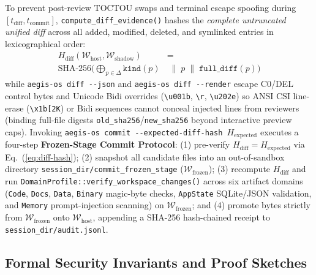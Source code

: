 \documentclass[10pt,twocolumn]{article}
\begin{document}
To prevent post-review TOCTOU swaps and terminal escape spoofing during $[t_{\text{diff}}, t_{\text{commit}}]$, \texttt{compute\_diff\_evidence()} hashes the \emph{complete untruncated unified diff} across all added, modified, deleted, and symlinked entries in lexicographical order:
\begin{equation}
\label{eq:diff-hash}
\begin{aligned}
H_{\text{diff}}(\mathcal{W}_{\text{host}}, \mathcal{W}_{\text{shadow}}) &= \\
\text{SHA-256}\Big(\bigoplus_{p \in \Delta} \texttt{kind}(p) &\;\|\; p \;\|\; \texttt{full\_diff}(p) \Big)
\end{aligned}
\end{equation}
while \texttt{aegis-os diff -\/-json} and \texttt{aegis-os diff -\/-render} escape C0/DEL control bytes and Unicode Bidi overrides (\texttt{\textbackslash u001b}, \texttt{\textbackslash r}, \texttt{\textbackslash u202e}) so ANSI CSI line-erase (\texttt{\textbackslash x1b[2K}) or Bidi sequences cannot conceal injected lines from reviewers (binding full-file digests \texttt{old\_sha256}/\texttt{new\_sha256} beyond interactive preview caps). Invoking \texttt{aegis-os commit -\/-expected-diff-hash $H_{\text{expected}}$} executes a four-step \textbf{Frozen-Stage Commit Protocol}: (1) pre-verify $H_{\text{diff}} = H_{\text{expected}}$ via Eq.~(\ref{eq:diff-hash}); (2) snapshot all candidate files into an out-of-sandbox directory \texttt{session\_dir/\allowbreak commit\_\allowbreak frozen\_\allowbreak stage} ($\mathcal{W}_{\text{frozen}}$); (3) recompute $H_{\text{diff}}$ and run \texttt{DomainProfile::\allowbreak verify\_\allowbreak workspace\_\allowbreak changes()} across six artifact domains (\texttt{Code}, \texttt{Docs}, \texttt{Data}, \texttt{Binary} magic-byte checks, \texttt{AppState} SQLite/JSON validation, and \texttt{Memory} prompt-injection scanning) on $\mathcal{W}_{\text{frozen}}$; and (4) promote bytes strictly from $\mathcal{W}_{\text{frozen}}$ onto $\mathcal{W}_{\text{host}}$, appending a SHA-256 hash-chained receipt to \texttt{session\_dir/audit.jsonl}.

\subsection{Formal Security Invariants and Proof Sketches}
\end{document}
